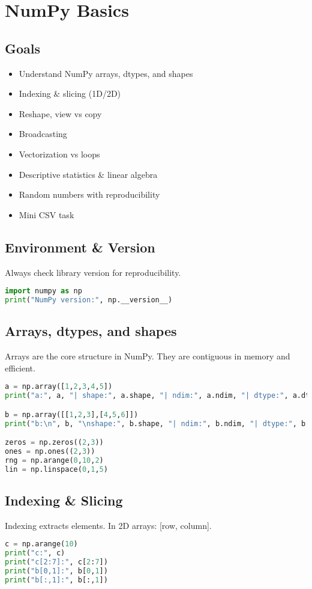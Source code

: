 
\chapter{NumPy Basics}

\section*{Goals}
\begin{itemize}
  \item Understand NumPy arrays, dtypes, and shapes
  \item Indexing \& slicing (1D/2D)
  \item Reshape, view vs copy
  \item Broadcasting
  \item Vectorization vs loops
  \item Descriptive statistics \& linear algebra
  \item Random numbers with reproducibility
  \item Mini CSV task
\end{itemize}

\section{Environment \& Version}
Always check library version for reproducibility.
\begin{lstlisting}[language=Python]
import numpy as np
print("NumPy version:", np.__version__)
\end{lstlisting}

\section{Arrays, dtypes, and shapes}
Arrays are the core structure in NumPy. They are contiguous in memory and efficient.

\begin{lstlisting}[language=Python]
a = np.array([1,2,3,4,5])
print("a:", a, "| shape:", a.shape, "| ndim:", a.ndim, "| dtype:", a.dtype)

b = np.array([[1,2,3],[4,5,6]])
print("b:\n", b, "\nshape:", b.shape, "| ndim:", b.ndim, "| dtype:", b.dtype)

zeros = np.zeros((2,3))
ones = np.ones((2,3))
rng = np.arange(0,10,2)
lin = np.linspace(0,1,5)
\end{lstlisting}

\section{Indexing \& Slicing}
Indexing extracts elements. In 2D arrays: [row, column].
\begin{lstlisting}[language=Python]
c = np.arange(10)
print("c:", c)
print("c[2:7]:", c[2:7])
print("b[0,1]:", b[0,1])
print("b[:,1]:", b[:,1])
\end{lstlisting}


